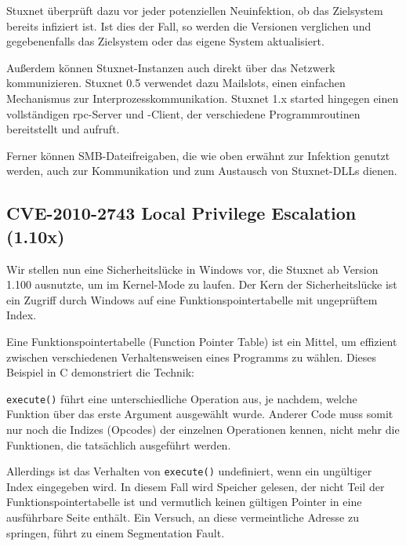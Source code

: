 \documentclass[a4paper]{article}
\begin{document}
Stuxnet überprüft dazu vor jeder potenziellen Neuinfektion, ob das Zielsystem bereits infiziert ist.
Ist dies der Fall, so werden die Versionen verglichen und gegebenenfalls das Zielsystem oder das eigene System aktualisiert.

Außerdem können Stuxnet-Instanzen auch direkt über das Netzwerk kommunizieren.
Stuxnet 0.5 verwendet dazu Mailslots, einen einfachen Mechanismus zur Interprozesskommunikation.
Stuxnet 1.x started hingegen einen vollständigen \gls{rpc}-Server und -Client, %
der verschiedene Programmroutinen bereitstellt und aufruft.

Ferner können SMB-Dateifreigaben, die wie oben erwähnt zur Infektion genutzt werden,
auch zur Kommunikation und zum Austausch von Stuxnet-DLLs dienen.

\subsection{CVE-2010-2743 Local Privilege Escalation (1.10x)}

Wir stellen nun eine Sicherheitslücke in Windows vor, die Stuxnet ab Version 1.100 ausnutzte, um im Kernel-Mode zu laufen.
Der Kern der Sicherheitslücke ist ein Zugriff durch Windows auf eine Funktionspointertabelle mit ungeprüftem Index.

Eine Funktionspointertabelle (Function Pointer Table) ist ein Mittel,
um effizient zwischen verschiedenen Verhaltensweisen eines Programms zu wählen.
Dieses Beispiel in C demonstriert die Technik:

\begin{figure}[H]
  
\end{figure}

\texttt{execute()} führt eine unterschiedliche Operation aus, je nachdem, welche Funktion über das erste Argument ausgewählt wurde.
Anderer Code muss somit nur noch die Indizes (Opcodes) der einzelnen Operationen kennen, nicht mehr die Funktionen, die tatsächlich ausgeführt werden.

Allerdings ist das Verhalten von \texttt{execute()} undefiniert, wenn ein ungültiger Index eingegeben wird.
In diesem Fall wird Speicher gelesen, der nicht Teil der Funktionspointertabelle ist und vermutlich keinen gültigen Pointer in eine ausführbare Seite enthält.
Ein Versuch, an diese vermeintliche Adresse zu springen, führt zu einem Segmentation Fault.
\end{document}
